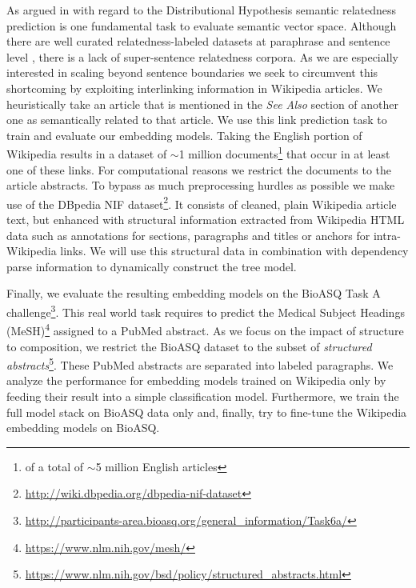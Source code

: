 As argued in \textcite{binder_comparison_2018} with regard to the Distributional Hypothesis \autocite{harris_distributional_1954} semantic relatedness \autocite{resnik_semantic_1999, budanitsky_evaluating_2006} prediction is one fundamental task to evaluate semantic vector space. Although there are well curated relatedness-labeled datasets at paraphrase and sentence level \autocite{pavlick_ppdb_2015, dolan_automatically_2005, marelli_sick_2014,cer_semeval-2017_2017}, there is a lack of super-sentence relatedness corpora. As we are especially interested in scaling beyond sentence boundaries %
we seek to circumvent this shortcoming by exploiting interlinking information in Wikipedia articles. We heuristically take an article that is mentioned in the \textit{See Also}  section of another one as semantically related to that article. We use this link prediction task to train and evaluate our embedding models. Taking the English portion of Wikipedia results in a dataset of $\sim$1 million documents\footnote{of a total of $\sim$5 million English articles} that occur in at least one of these links. For computational reasons we restrict the documents to the article abstracts. To bypass as much preprocessing hurdles as possible we make use of the DBpedia NIF \autocite{dojchinovski_dbpedia_2018} dataset\footnote{\url{http://wiki.dbpedia.org/dbpedia-nif-dataset}}. It consists of cleaned, plain Wikipedia article text, but enhanced with structural information extracted from Wikipedia HTML data such as annotations for sections, paragraphs and titles or anchors for intra-Wikipedia links. We will use this structural data in combination with dependency parse information to dynamically construct the tree model.

Finally, we evaluate the resulting embedding models on the BioASQ Task A challenge\footnote{\url{http://participants-area.bioasq.org/general_information/Task6a/}}. This real world task requires to predict the Medical Subject Headings (MeSH)\footnote{\url{https://www.nlm.nih.gov/mesh/}} assigned to a PubMed abstract. As we focus on the impact of structure to composition, we restrict the BioASQ dataset to the subset of \textit{structured abstracts}\footnote{\url{https://www.nlm.nih.gov/bsd/policy/structured_abstracts.html}}. These PubMed abstracts are separated into labeled paragraphs. We analyze the performance for embedding models trained on Wikipedia only by feeding their result into a simple classification model. Furthermore, we train the full model stack on BioASQ data only and, finally, try to fine-tune the Wikipedia embedding models on BioASQ.  



